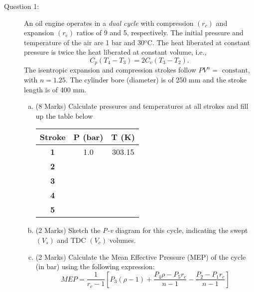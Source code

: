 \documentclass[12pt,twoside]{report}
\newcommand{\frc}{\displaystyle\frac}
\begin{document}
\setcounter{page}{1}

\vfill

\pagebreak


\begin{description}

\item [Question 1:] An oil engine operates in a {\it dual cycle} with compression $\left(r_{c}\right)$ and expansion $\left(r_{e}\right)$ ratios of 9 and 5, respectively. The initial pressure and temperature of the air are 1 bar and 30$^{\text{o}}$C. The heat liberated at constant pressure is twice the heat liberated at constant volume, i.e.,
\begin{displaymath}
C_{p}\left(T_{4}-T_{3}\right)=2 C_{v}\left(T_{3}-T_{2}\right).
\end{displaymath}
The isentropic expansion and compression strokes follow $PV^{n}=\text{ constant}$, with $n=1.25$. The cylinder bore (diameter) is of 250 mm and the stroke length is of 400 mm. 
\begin{enumerate}[(a)]

\item (8 Marks) Calculate pressures and temperatures at all strokes and fill up the table below
\begin{center}
\begin{tabular}{||c |c |c ||}
\hline \hline
 {\bf Stroke}  &  {\bf P (bar)}   &  {\bf T (K)} \\
\hline\hline
{\bf 1 }       &     1.0          &    303.15    \\
\hline         
{\bf 2 }       &                  &             \\
\hline         
{\bf 3 }       &                  &             \\
\hline         
{\bf 4 }       &                  &             \\
\hline         
{\bf 5 }       &                  &             \\
\hline\hline         
\end{tabular}
\end{center}

\item (2 Marks) Sketch the {\it P-v} diagram for this cycle, indicating the swept $\left(V_{s}\right)$ and TDC $\left(V_{c}\right)$ volumes.

\item (2 Marks) Calculate the Mean Effective Pressure (MEP) of the cycle (in bar) using the following expression:
\begin{displaymath}
MEP = \frc{1}{r_{c}-1} \left[ P_{3}\left(\rho-1\right) + \frc{P_{4}\rho-P_{5}r_{c}}{n-1} - \frc{P_{2}-P_{1}r_{c}}{n-1}\right]
\end{displaymath}


\end{enumerate}
\end{description}
\end{document}
